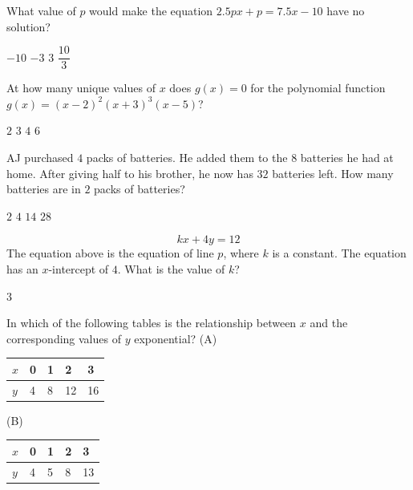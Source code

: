 \question[1]
What value of $p$ would make the equation $2.5 p x + p = 7.5 x - 10$ have no solution?
\begin{choices}
  \choice $-10$
  \choice $-3$
  \CorrectChoice $3$
  \choice $\dfrac{10}{3}$
\end{choices}

\question[1]
At how many unique values of $x$ does $g(x) = 0$ for the polynomial function $g(x) = (x-2)^2(x+3)^3(x-5)$?
\begin{choices}
  \choice $2$
  \CorrectChoice $3$
  \choice $4$
  \choice $6$
\end{choices}






\newpage




\question[1]
AJ purchased $4$ packs of batteries. He added them to the $8$ batteries he had at home. After giving half to his brother, he now has $32$ batteries left. How many batteries are in $2$ packs of batteries?
\begin{choices}
  \choice $2$
  \choice $4$
  \choice $14$
  \CorrectChoice $28$
\end{choices}

\question[1]
\[
k x + 4 y = 12
\]
The equation above is the equation of line $p$, where $k$ is a constant. The equation has an $x$-intercept of $4$. What is the value of $k$?
\begin{solution}
3
\end{solution}






\newpage




\question[1]
In which of the following tables is the relationship between $x$ and the corresponding values of $y$ exponential?
\medskip
\noindent (A)
\begin{center}
  \renewcommand{\arraystretch}{1.3}
  \setlength{\tabcolsep}{0.5em}
  \begin{tabular}{|l|l|l|l|l|}
  \hline
  \rowcolor[HTML]{E0E0E0}
  $x$ & 0 & 1 & 2 & 3 \\
  \hline
  $y$ & 4 & 8 & 12 & 16 \\
  \hline
  \end{tabular}
\end{center}

\noindent (B)
\begin{center}
  \renewcommand{\arraystretch}{1.3}
  \setlength{\tabcolsep}{0.5em}
  \begin{tabular}{|l|l|l|l|l|}
  \hline
  \rowcolor[HTML]{E0E0E0}
  $x$ & 0 & 1 & 2 & 3 \\
  \hline
  $y$ & 4 & 5 & 8 & 13 \\
  \hline
  \end{tabular}
\end{center}

